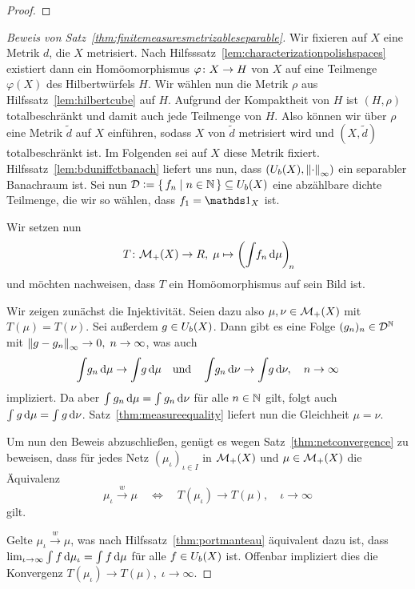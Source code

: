 \documentclass[../main/main.tex]{subfiles}
\begin{document}
	\begin{proof}
	\end{proof}

	\begin{proof}[Beweis von Satz~\ref{thm:finitemeasuresmetrizableseparable}]
		Wir fixieren auf $X$ eine Metrik $d$, die $X$ metrisiert. Nach Hilfsssatz~\ref{lem:characterizationpolishspaces} existiert dann ein Homöomorphismus $\varphi \colon X \to H$ von
		$X$ auf eine Teilmenge $\varphi(X)$ des Hilbertwürfels $H$. Wir wählen nun die Metrik $\rho$ aus Hilfssatz~\ref{lem:hilbertcube} auf $H$. Aufgrund der Kompaktheit von $H$ ist
		$(H, \rho)$ totalbeschränkt und damit auch jede Teilmenge von $H$. Also können wir über $\rho$ eine Metrik $\tilde{d}$ auf $X$ einführen, sodass $X$ von $\tilde{d}$ 
		metrisiert wird und $(X, \tilde{d})$ totalbeschränkt ist. Im Folgenden sei auf $X$ diese Metrik fixiert. Hilfssatz~\ref{lem:bduniffctbanach} liefert uns nun, dass 
		$(U_b(X), \left\lVert\cdot\right\rVert_\infty)$ ein separabler Banachraum ist. Sei nun $\mathcal{D} \vcentcolon = \left\{\, f_n \; \middle| \; n \in \mathbb{N} \,\right\} \subseteq U_b(X)$ eine abzählbare dichte Teilmenge, 
		die wir so wählen, dass $f_1 = \indfct_X$ ist.
		
		Wir setzen nun
		\[ T \colon \mathcal{M}_{+}(X) \to R, \; \mu \mapsto \left( \int_{} \, f_n \, \mathrm{d}\mu \right)_{\! n}  \! \]
		und möchten nachweisen, dass $T$ ein Homöomorphismus auf sein Bild ist.
		
		Wir zeigen zunächst die Injektivität. Seien dazu also $\mu, \nu \in \mathcal{M}_{+}(X)$ mit $T(\mu) = T(\nu)$. 
		Sei außerdem $g \in U_b(X)$. Dann gibt es eine Folge $(g_n)_n \in \mathcal{D}^{\mathbb{N}}$ mit $\left\lVert g - g_n\right\rVert_\infty \to 0, \; n \to \infty$, was auch 
		\[ \int_{} \, g_n \, \mathrm{d}\mu \to \int_{} \, g \, \mathrm{d}\mu \quad \text{und} \quad \int_{} \, g_n \, \mathrm{d}\nu \to \int_{} \, g \, \mathrm{d}\nu, \quad n \to \infty \]
		impliziert. Da aber $\int_{} \, g_n \, \mathrm{d}\mu = \int_{} \, g_n \, \mathrm{d}\nu$ für alle $n \in \mathbb{N}$ gilt, folgt auch $\int_{} \, g \, \mathrm{d}\mu = \int_{} \, g \, \mathrm{d}\nu$.
		Satz~\ref{thm:measureequality} liefert nun die Gleichheit $\mu = \nu$.
		
		Um nun den Beweis abzuschließen, genügt es wegen Satz~\ref{thm:netconvergence} zu beweisen, dass für jedes Netz $(\mu_\iota)_{\iota \in I}$ in $\mathcal{M}_{+}(X)$ und $\mu \in \mathcal{M}_{+}(X)$ die
		Äquivalenz
		\[ \mu_\iota \xrightarrow{w} \mu \quad \iff \quad T(\mu_\iota) \to T(\mu), \quad \iota \to \infty  \]
		gilt.
		
		Gelte $\mu_\iota \xrightarrow{w} \mu$, was nach Hilfssatz~\ref{thm:portmanteau} äquivalent dazu ist, dass $\lim_{\iota \to \infty} \int_{} \, f \, \mathrm{d}\mu_\iota = \int_{} \, f \, \mathrm{d}\mu$ für alle 
		$f \in U_b(X)$ ist. Offenbar impliziert dies die Konvergenz $T(\mu_\iota) \to T(\mu), \; \iota \to \infty$.
		

\end{proof}
\end{document}

